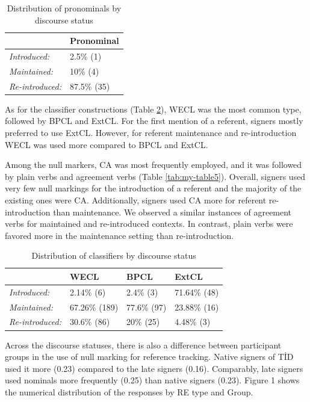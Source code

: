 \documentclass[review]{elsarticle} %
\begin{document}
\begin{table}
\small
\caption{Distribution of pronominals by discourse status}
\label{tab:my-table3}
\begin{tabular}{ll}
\hline
                        & Pronominal  \\ \hline
\textit{Introduced:}    & 2.5\% (1)   \\
\textit{Maintained:}    & 10\% (4)    \\
\textit{Re-introduced:} & 87.5\% (35) \\ \hline
\end{tabular}
\end{table}

As for the classifier constructions (Table \ref{tab:my-table4}), WECL
was the most common type, followed by BPCL and ExtCL. For the first
mention of a referent, signers mostly preferred to use ExtCL. However,
for referent maintenance and re-introduction WECL was used more compared
to BPCL and ExtCL.

Among the null markers, CA was most frequently employed, and it was
followed by plain verbs and agreement verbs (Table \ref{tab:my-table5}).
Overall, signers used very few null markings for the introduction of a
referent and the majority of the existing ones were CA. Additionally,
signers used CA more for referent re-introduction than maintenance. We
observed a similar instances of agreement verbs for maintained and
re-introduced contexts. In contrast, plain verbs were favored more in
the maintenance setting than re-introduction.

\begin{table}
\small
\caption{Distribution of classifiers by discourse status}
\label{tab:my-table4}
\begin{tabular}{llll}
\hline
                        & WECL          & BPCL        & ExtCL         \\ \hline
\textit{Introduced:}    & 2.14\% (6)    & 2.4\% (3)   & 71.64\% (48) \\
\textit{Maintained:}    & 67.26\% (189) & 77.6\% (97) & 23.88\% (16) \\
\textit{Re-introduced:} & 30.6\% (86)   & 20\% (25)   & 4.48\% (3)   \\ \hline
\end{tabular}
\end{table}

Across the discourse statuses, there is also a difference between
participant groups in the use of null marking for reference tracking.
Native signers of TİD used it more (0.23) compared to the late signers
(0.16). Comparably, late signers used nominals more frequently (0.25)
than native signers (0.23). Figure 1 shows the numerical distribution of
the responses by RE type and Group.
\end{document}
